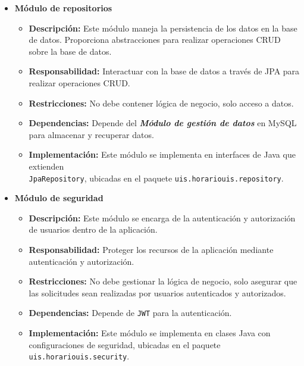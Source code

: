 \documentclass{article} %
\begin{document}
\begin{itemize}
\begin{itemize}
            \item \textbf{Módulo de repositorios}
            \begin{itemize}
                \item \textbf{Descripción:} Este módulo maneja la persistencia de los datos en la base de datos. Proporciona abstracciones para realizar operaciones CRUD sobre la base de datos.
                \item \textbf{Responsabilidad:} Interactuar con la base de datos a través de JPA para realizar operaciones CRUD.
                \item \textbf{Restricciones:} No debe contener lógica de negocio, solo acceso a datos.
                \item \textbf{Dependencias:} Depende del \textbf{\emph{Módulo de gestión de datos}} en MySQL para almacenar y recuperar datos.
                \item \textbf{Implementación:} Este módulo se implementa en interfaces de Java que extienden \\\texttt{JpaRepository}, ubicadas en el paquete \texttt{uis.horariouis.repository}.
            \end{itemize}
            
            \item \textbf{Módulo de seguridad}
            \begin{itemize}
                \item \textbf{Descripción:} Este módulo se encarga de la autenticación y autorización de usuarios dentro de la aplicación.
                \item \textbf{Responsabilidad:} Proteger los recursos de la aplicación mediante autenticación y autorización.
                \item \textbf{Restricciones:} No debe gestionar la lógica de negocio, solo asegurar que las solicitudes sean realizadas por usuarios autenticados y autorizados.
                \item \textbf{Dependencias:} Depende de \texttt{\texttt{JWT}} para la autenticación.
                \item \textbf{Implementación:} Este módulo se implementa en clases Java con configuraciones de seguridad, ubicadas en el paquete \texttt{uis.horariouis.security}.
            \end{itemize}
        \end{itemize}
        

\end{itemize}
\end{document}
